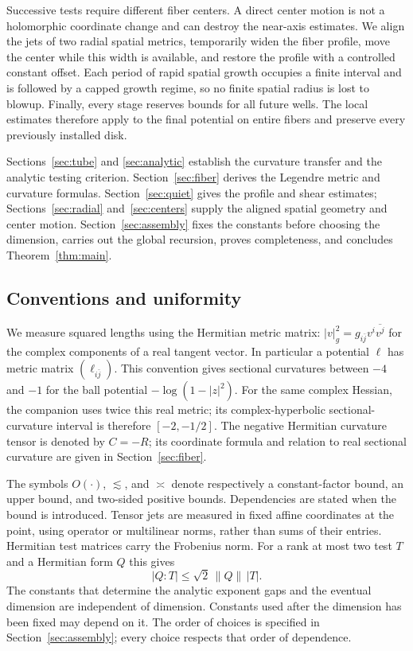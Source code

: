 Successive tests require different fiber centers. A direct center
motion is not a holomorphic coordinate change and can destroy the
near-axis estimates. We align the jets of two radial spatial metrics,
temporarily widen the fiber profile, move the center while this width
is available, and restore the profile with a controlled constant
offset. Each period of rapid spatial growth occupies a finite interval
and is followed by a capped growth regime, so no finite spatial radius
is lost to blowup. Finally, every stage reserves bounds for all future
wells. The local estimates therefore apply to the final potential on
entire fibers and preserve every previously installed disk.

Sections~\ref{sec:tube} and \ref{sec:analytic} establish the curvature
transfer and the analytic testing criterion. Section~\ref{sec:fiber}
derives the Legendre metric and curvature formulas.
Section~\ref{sec:quiet} gives the profile and shear estimates;
Sections~\ref{sec:radial} and~\ref{sec:centers} supply the aligned spatial
geometry and center motion. Section~\ref{sec:assembly} fixes the
constants before choosing the dimension, carries out the global
recursion, proves completeness, and concludes Theorem~\ref{thm:main}.

\subsection{Conventions and uniformity}

We measure squared lengths using the Hermitian metric matrix:
$|v|_g^2=g_{i\bar j}v^i\overline{v^j}$ for the complex components of a
real tangent vector. In particular a potential $\ell$ has metric matrix
$(\ell_{i\bar j})$. This convention gives sectional curvatures between
$-4$ and $-1$ for the ball potential $-\log(1-|z|^2)$.
For the same complex Hessian, the companion
\citep[Section~2]{OpenAIPinchedThreefold2026} uses twice this real metric;
its complex-hyperbolic sectional-curvature interval is therefore
$[-2,-1/2]$.
The negative Hermitian curvature tensor is denoted by $C=-R$; its
coordinate formula and relation to real sectional curvature are given
in Section~\ref{sec:fiber}.

The symbols $O(\cdot)$, $\lesssim$, and $\asymp$ denote respectively
a constant-factor bound, an upper bound, and two-sided positive bounds.
Dependencies are stated when the bound is introduced. Tensor jets are
measured in fixed affine coordinates at the point, using operator or
multilinear norms, rather than sums of their entries. Hermitian test
matrices carry the Frobenius norm. For a rank at most two test $T$ and a
Hermitian form $Q$ this gives
\[
 |Q:T|\le\sqrt2\,\|Q\|\,|T|.
\]
The constants that determine the analytic exponent gaps and the eventual
dimension are independent of dimension. Constants used after the
dimension has been fixed may depend on it. The order of choices is
specified in Section~\ref{sec:assembly}; every choice respects that
order of dependence.
